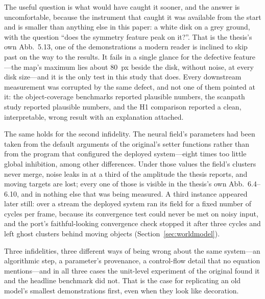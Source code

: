 \documentclass[11pt,a4paper]{article}
\begin{document}
The useful question is what would have caught it sooner, and the answer is
uncomfortable, because the instrument that caught it was available from the
start and is smaller than anything else in this paper: a white disk on a grey
ground, with the question ``does the symmetry feature peak on it?''. That is the
thesis's own Abb.~5.13, one of the demonstrations a modern reader is inclined to
skip past on the way to the results. It fails in a single glance for the
defective feature---the map's maximum lies about 80~px beside the disk, without
noise, at every disk size---and it is the only test in this study that does.
Every downstream measurement was corrupted by the same defect, and not one of
them pointed at it: the object-coverage benchmarks reported plausible numbers,
the scanpath study reported plausible numbers, and the H1 comparison reported a
clean, interpretable, wrong result with an explanation attached.

The same holds for the second infidelity. The neural field's parameters had been
taken from the default arguments of the original's setter functions rather than
from the program that configured the deployed system---eight times too little
global inhibition, among other differences. Under those values the field's
clusters never merge, noise leaks in at a third of the amplitude the thesis
reports, and moving targets are lost; every one of those is visible in the
thesis's own Abb.~6.4--6.10, and in nothing else that was being measured. A
third instance appeared later still: over a stream the deployed system ran its
field for a fixed number of cycles per frame, because its convergence test could
never be met on noisy input, and the port's faithful-looking convergence check
stopped it after three cycles and left ghost clusters behind moving objects
(Section~\ref{sec:worldmodel}).

Three infidelities, three different ways of being wrong about the same
system---an algorithmic step, a parameter's provenance, a control-flow detail
that no equation mentions---and in all three cases the unit-level experiment of
the original found it and the headline benchmark did not. That is the case for
replicating an old model's smallest demonstrations first, even when they look
like decoration.
\end{document}
